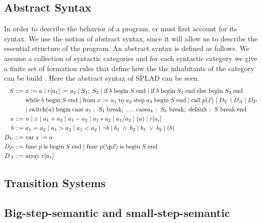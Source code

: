 \subsection{Abstract Syntax}
In order to describe the behavior of a program, er must first account for its syntax. We use the notion of abstract syntax, since it will allow us to describe the essential structure of the program. An abstract syntax is defined as follows. We assume a collection of syntactic categories and for each syntactic category we give a finite set of formation rules that define how the the inhabitants of the category can be build \citep{HHTree}.
Here the abstract syntax of SPLAD can be seen. 
\begin{align*}
S::= \; & x := a \; | \; r[a_1] := a_2 \; | \; S_1; \; S_2 \; | \; \text{if} \; b \; \text{begin} \; S \; \text{end} \; | \; \text{if} \; b \; \text{begin} \; S_1 \; \text{end} \; \text{else begin} \; S_2 \; \text{end} \\
~ & \text{while} \; b \; \text{begin} \; S \; \text{end} \; | \; \text{from} \; x := a_1 \; \text{to} \; a_2 \; \text{step} \; a_3 \; \text{begin} \; S \; \text{end} \; | \; \text{call} \; p(\vec{x}) \; | \; D_V \; | \; D_A \; | \; D_P \\
~ & | \; \text{switch}(a) \; \text{begin} \; \text{case } a_1: \; S_1 \; \text{break}; \; \dots \; \text{case} a_k: \; S_k \; \text{break}; \; \text{default}: \; S \; \text{break} \; \text{end} \\
a::= \; & n \; | \; x \; | \; a_1 + a_2 \; | \; a_1 - a_2 \; | \; a_1 * a_2 \; | \; a_1 / a_2 \; | \; (a) \; | \; r[a_i]\\
b::= \; &a_1 = a_2 \; | \; a_1 > a_2 \; | \; a_1 < a_2 \; | \; \neg b \; | \; b_1 \; \wedge \; b_2 \; | \; b_1 \; \vee \; b_2 \; | \; (b)\\
D_V::= \; & \text{var} \; x := a \\
D_P::= \; & \text{func} \; p \; \text{is} \; \text{begin} \; S \; \text{end} \; | \; \text{func} \; p(\p \vec{x}) \; \text{is} \; \text{begin} \; S \; \text{end} \\
D_A::= \; & \text{array} \; r[a_1] \\
\end{align*}

\subsection{Transition Systems}


\subsection{Big-step-semantic and small-step-semantic}


